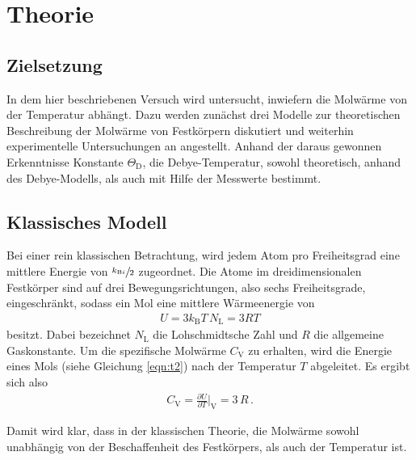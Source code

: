 \section{Theorie}
\label{sec:Theorie}

\subsection{Zielsetzung}
\label{subsec:zielsetzung}
In dem hier beschriebenen Versuch wird untersucht,
inwiefern die Molwärme von der Temperatur abhängt.
Dazu werden zunächst drei Modelle zur theoretischen Beschreibung
der Molwärme von Festkörpern diskutiert und weiterhin experimentelle
Untersuchungen an  angestellt.
Anhand der daraus gewonnen Erkenntnisse Konstante $\Theta_{\text{D}}$,
die Debye-Temperatur, sowohl theoretisch, anhand des Debye-Modells,
als auch mit Hilfe der Messwerte bestimmt.

\subsection{Klassisches Modell}
\label{subsec:klassisch}
Bei einer rein klassischen Betrachtung, wird jedem Atom pro Freiheitsgrad eine mittlere
Energie von $\sfrac{k_{\text{B}i}}{2}$ zugeordnet. Die Atome im dreidimensionalen
Festkörper sind auf drei Bewegungsrichtungen, also sechs Freiheitsgrade, eingeschränkt, sodass
ein Mol eine mittlere Wärmeenergie von
\begin{align}
	U = 3 k_{\text{B}} T \, N_{\text{L}} = 3 R T\label{eqn:t2}
\end{align}
besitzt. Dabei bezeichnet $N_{\text{L}}$ die
Lohschmidtsche Zahl und
$R$ die allgemeine Gaskonstante.
Um die spezifische Molwärme $C_{\text{V}}$ zu erhalten,
wird die Energie eines Mols (siehe Gleichung \eqref{eqn:t2})
nach der Temperatur $T$ abgeleitet.
Es ergibt sich also
\begin{align}
	C_{\text{V}} = \frac{\partial U}{\partial T}
	\bigg\vert_{\text{V}} = 3 \, R \, . \label{eqn:t3}
\end{align}

Damit wird klar, dass in der klassischen Theorie,
die Molwärme sowohl unabhängig von der Beschaffenheit des
Festkörpers, als auch der Temperatur ist.


